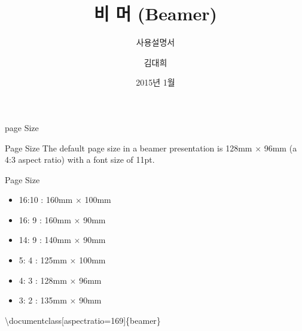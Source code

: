 \documentclass[10pt,blue,xcolor=pdftex,dvipsnames,table,handout]{beamer}
\begin{document}
	

			\title{비 머 (Beamer)}
			\subtitle{사용설명서}
			\author{김대희}
			\date[2011.11.10]{2015년 1월}



		\begin{frame}[plain]
		\titlepage
		\end{frame}


		\begin{frame}[t]{page Size}

			\begin{block} {Page Size}
			The default page size 
			in a beamer presentation is 128mm $\times$ 96mm (a 4:3 aspect ratio) 
			with a font size of 11pt.
			\end{block}


			\begin{block}{Page Size}
			\begin{itemize}
			\item 16:10 : 160mm $\times$ 100mm
			\item 16: 9 : 160mm $\times$ 90mm
			\item 14: 9 : 140mm $\times$ 90mm
			\item  5: 4 : 125mm $\times$ 100mm
			\item  4: 3 : 128mm $\times$ 96mm
			\item  3: 2 : 135mm $\times$ 90mm
			\end{itemize}
			\end{block}


%		

			\textbackslash documentclass[aspectratio=169]\{beamer\}

		\end{frame}
\end{document}
